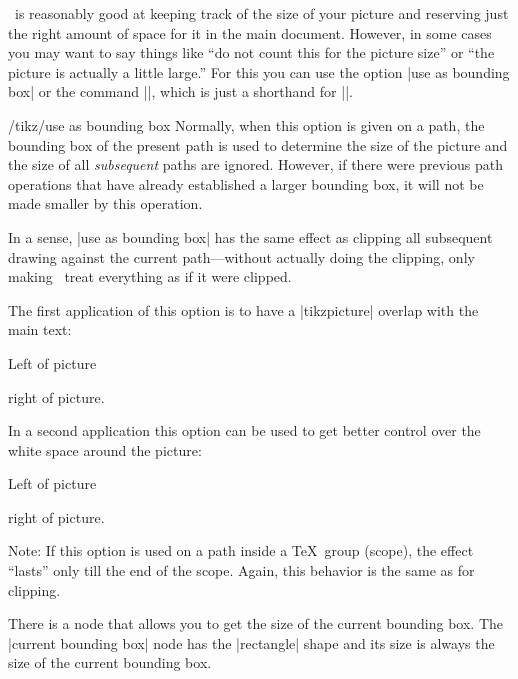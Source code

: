 \pgfname\ is reasonably good at keeping track of the size of your picture
and reserving just the right amount of space for it in the main
document. However, in some cases you may want to say things like
``do not count this for the picture size'' or ``the picture is
actually a little large.'' For this you can use the option
|use as bounding box| or the command |\useasboundingbox|, which is just
a shorthand for ||.

\begin{key}{/tikz/use as bounding box}
  Normally, when this option is given on a path, the bounding box of
  the present path is used to determine the size of the picture and
  the size of all \emph{subsequent} paths are
  ignored. However, if there were previous path operations that have
  already established a larger bounding box, it will not be made
  smaller by this operation.

  In a sense, |use as bounding box| has the same effect as clipping
  all subsequent drawing against the current path---without actually
  doing the clipping, only making \pgfname\ treat everything as if it
  were clipped.

  The first application of this option is to have a |{tikzpicture}|
  overlap with the main text:

\begin{codeexample}[]
Left of pictureright of picture.
\end{codeexample}

  In a second application this option can be used to get better
  control over the white space around the picture:
  
\begin{codeexample}[]
Left of picture
right of picture.
\end{codeexample}

  Note: If this option is used on a path inside a \TeX\ group (scope),
  the effect ``lasts'' only till the end of the scope. Again, this
  behavior is the same as for clipping.
\end{key}

There is a node that allows you to get the size of the current
bounding box. The |current bounding box| node has the |rectangle|
shape and its size is always the size of the current 
bounding box.

